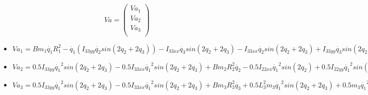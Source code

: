 \[
Va=
\begin{pmatrix}
Va_{1}\\
Va_{2}\\
Va_{3}\\
\end{pmatrix} \] 
\begin{itemize}
	\item 
	$Va_{1}=Bm_{1}\dot{q_{1}}R_{1}^{2}
	-\dot{q_{1}}(I_{33yy}\dot{q_{2}} sin(2q_{2}+2q_{3}))
	-I_{33xx}\dot{q_{3}} sin(2q_{2}+2q_{3})
	-I_{33xx}\dot{q_{2}} sin(2q_{2}+2q_{3})
	+I_{33yy}\dot{q_{3}} sin(2q_{2}+2q_{3})
	-I_{22xx}\dot{q_{2}} sin(2q_{2})
	+I_{22yy}\dot{q_{2}} sin(2q_{2})
	 +m_{3}\dot{q_{2}}s_{33x}^{2}sin(2q_{2}+2q_{3})
	+m_{3}\dot{q_{3}}s_{33x}^{2}sin(2q_{2}+2q_{3})
	+L_{2}^{2}m_2 \dot{q_{2}}sin(2q_{2})
	+L_{2}^{2}m_{3}\dot{q_{2}}sin( 2q_{2})
	+m_{2}\dot{q_{2}}s_{22x}^{2}sin(2q_{2})
	+L_{3}^{2}m_{3} \dot{q_{2}}sin(2q_{2}+2q_{3})
	+L_{3}^{2}m_{3} \dot{q_{3}}sin(2q_{2}+2q_{3})
	+2L_{3}L_{2}m_{3} \dot{q_{2}}sin(2q_{2}+q_{3})
	+L_{3}L_{2}m_{3} \dot{q_{3}}sin(2q_{2}+q_{3})
	-2L_{2}m_{3}\dot{q_{2}}s_{33x}sin(2q_{2}+q_{3})
	-L_{2}m_{3}\dot{q_{3}}s_{33x}sin(2q_{2}+q_{3})
	-2L_{2}m_{2}\dot{q_{2}}s_{22x}sin(2q_{2})
	+L_{3}L_{2}m_{3} \dot{q_{3}}sin(q_{3})
	-L_{2}m_{3} \dot{q_{3}}s_{33x}sin(q_{3})
	-2L_{3}m_{3}\dot{q_{2}}s_{33x}^{2}sin(2q_{2}+2q_{3})
	-2L_{3}m_{3}\dot{q_{3}}s_{33x}^{2}sin(2q_{2}+2q_{3})
	$
	\item 
	$Va_{2}=0.5I_{33yy}\dot{q_{1}}^{2}sin(2q_{2}+2q_{3})
	-0.5I_{33xx}\dot{q_{1}}^{2}sin(2q_{2}+2q_{3})
	+Bm_{2}R_{2}^{2}\dot{q_{2}}
	-0.5I_{22xx}\dot{q_{1}}^{2}sin(2q_{2})
	+0.5I_{22yy}\dot{q_{1}}^{2}sin(2q_{2})
	+0.5L_{3}^{2}m_{3} \dot{q_{1}}^{2}sin(2q_{2}+2q_{3})
	+0.5m_{3}\dot{q_{1}}^{2}s_{33x}^{2}sin(2q_{2}+2q_{3})
	+0.5L_{2}^{2}m_{2} \dot{q_{1}}^{2}sin(2q_{2})
	+0.5L_{2}^{2}m_{3} \dot{q_{1}}^{2}sin(2q_{2})
	+0.5m_{2} \dot{q_{1}}^{2}s_{22x}^{2}sin(2q_{2})
	-L_{3}L_{2}m_{3} \dot{q_{3}}^{2}sin(q_{3})
	+L_{2}m_{3}\dot{q_{3}}^{2}s_{33x}sin(q_{3})
	-L_{3}m_{3}\dot{q_{1}}^{2}s_{33x}sin(2q_{2}+2q_{3})
	+L_{3}L_{2}m_{3} \dot{q_{1}}^{2}sin(2q_{2}+q_{3})
	-L_{2}m_{3}\dot{q_{1}}^{2}s_{33x}sin(2q_{2}+q_{3})
	-L_{2}m_{2}\dot{q_{1}}^{2}s_{22x}sin(2q_{2})
	-2L_{3}L_{2}m_{3} \dot{q_{3}}\dot{q_{2}}sin(q_{3})
	+2L_{2}m_{3} \dot{q_{2}}\dot{q_{3}}s_{33x}sin(q_{3})
	$
	
	\item 
	$Va_{3}=0.5I_{33yy}\dot{q_{1}}^{2}sin(2q_{2}+2q_{3})
	-0.5I_{33xx}\dot{q_{1}}^{2}sin(2q_{2}+2q_{3})
	+Bm_{3}R_{3}^{2}\dot{q_{3}}
	+0.5L_{3}^{2}m_{3} \dot{q_{1}}^{2}sin(2q_{2}+2q_{3})
	+0.5m_{3}\dot{q_{1}}^{2}s_{33x}^{2}sin(2q_{2}+2q_{3})
	+0.5L_{3}L_{2}m_{3} \dot{q_{1}}^{2}sin(q_{3})
	+L_{3}L_{2}m_{3} \dot{q_{2}}^{2}sin(q_{3})
	-0.5m_{3}L_{2}\dot{q_{1}}^{2}s_{33x}sin(q_{3})
	-m_{3}L_{2}\dot{q_{2}}^{2}s_{33x}sin(q_{3})
	-L_{3}m_{3}\dot{q_{1}}^{2}s_{33x}sin(2q_{2}+2q_{3})
	+0.5L_{2}L_{3}m_{3}\dot{q_{1}}^{2}sin(2q_{2}+q_{3})
	-0.5L_{2}m_{3}\dot{q_{1}}^{2}s_{33x}sin(2q_{2}+q_{3})
	$
\end{itemize}

